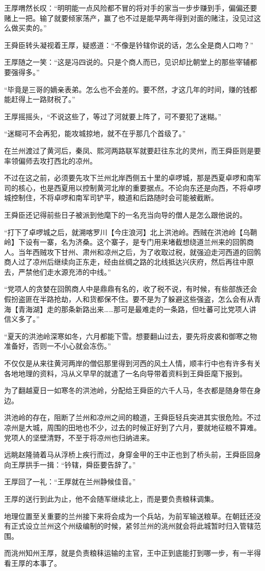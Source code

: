 王厚喟然长叹：“明明能一点风险都不冒的将对手的家当一步步赚到手，偏偏还要赌上一把。输了就要倾家荡产，赢了也不过是能早两年得到对面的赌注，没见过这么做买卖的。”

王舜臣转头凝视着王厚，疑惑道：“不像是钤辖你说的话，怎么全是商人口吻？”

王厚随之一笑：“这是冯四说的。只是个商人而已，见识却比朝堂上的那些宰辅都要强得多。”

“毕竟是三哥的嫡亲表弟。怎么也不会差的。要不然，才这几年的时间，赚的钱都能赶得上一路财税了。”

王厚摇摇头，“不说这些了，等过了河就要上阵了，可不要犯了迷糊。”

“迷糊可不会再犯，能攻城掠地，就不在乎那几个首级了。”

在兰州渡过了黄河后，秦凤、熙河两路联军就要赶往东北的灵州，而王舜臣则是要率领偏师去攻打西北的凉州。

不过在这之前，必须要先攻下兰州北岸西侧五十里的卓啰城，那是西夏卓啰和南军司的核心，也是西夏用以控制黄河北岸的重要据点。不论向东还是向西，不将卓啰城控制住，不将卓啰和南军司铲平，粮道和后路随时会可能被截断。

王舜臣还记得前些日子被派到他麾下的一名充当向导的僧人是怎么跟他说的。

“打下了卓啰城之后，就溯喀罗川【今庄浪河】北上洪池岭。西贼在洪池岭【乌鞘岭】下设有一寨，名为济桑。这个寨子，是专门用来堵截想绕道兰州来的回鹘商人。当年西贼攻下甘州、肃州和凉州之后，为了收取过税，就强迫走河西道的回鹘商人过了凉州后继续向正东走，经由丝绸之路的北线抵达兴庆府，然后再往中原去，严禁他们走水源充沛的中线。”

“党项人的贪婪在回鹘商人中是鼎鼎有名的，收了税不说，有时候，有些部族还会假扮盗匪在半路抢劫，人和货都保不住。要不是为了躲避这些强盗，怎么会有从青海【青海湖】走的那条新路出来……那可是最难走的一条路，但吐蕃可比党项人讲信义多了。”

“夏天的洪池岭深寒如冬，六月都能下雪。想要翻山过去，要先将皮裘和御寒之物准备好，否则一不小心就会冻伤。”

不仅仅是从来往黄河两岸的僧侣那里得到河西的风土人情，顺丰行中也有许多有关各地地理的资料，冯从义早早的就遣了一名向导带着资料到王舜臣麾下报到。

为了翻越夏日一如寒冬的洪池岭，分配给王舜臣的六千人马，冬衣都是随身带在身边。

洪池岭的存在，阻断了兰州和凉州之间的粮道，王舜臣轻兵突进其实很危险。不过凉州是大城，周围的田地也不少，过去的时候正好到了六月，要就地征粮不算难。党项人的坚壁清野，不至于将凉州也归纳进来。

远眺赵隆骑着马从浮桥上疾行而过，身穿金甲的王中正也到了桥头前，王舜臣回身向王厚拱手一揖：“钤辖，舜臣要告辞了。”

王厚回了一礼：“王厚就在兰州静候佳音。”

王厚的送行到此为止，他不会随军继续北上，而是要负责粮秣调集。

地理位置至关重要的兰州接下来将会成为一个兵站，为前军输送粮草。在朝廷还没有正式设立兰州这个州级编制的时候，紧邻兰州的洮州就会将此城暂时归入管辖范围。

而洮州知州王厚，就是负责粮秣运输的主官，王中正到底能打到哪一步，有一半得看王厚的本事了。


